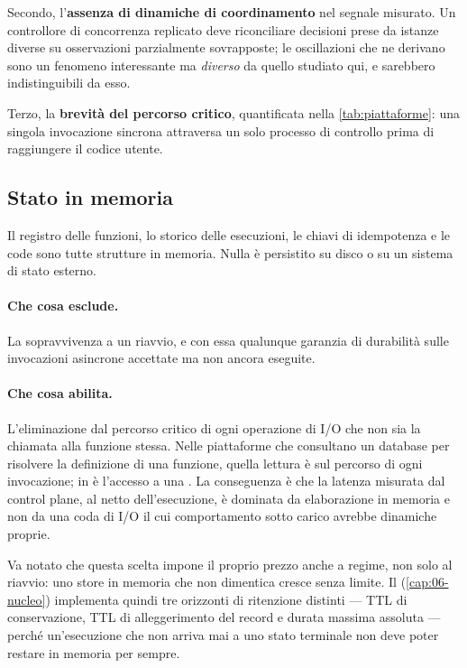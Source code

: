Secondo, l'\textbf{assenza di dinamiche di coordinamento} nel segnale misurato.
Un controllore di concorrenza replicato deve riconciliare decisioni prese da
istanze diverse su osservazioni parzialmente sovrapposte; le oscillazioni che ne
derivano sono un fenomeno interessante ma \emph{diverso} da quello studiato qui,
e sarebbero indistinguibili da esso.

Terzo, la \textbf{brevit\`a del percorso critico}, quantificata nella
\cref{tab:piattaforme}: una singola invocazione sincrona attraversa un solo
processo di controllo prima di raggiungere il codice utente.

\subsection{Stato in memoria}

Il registro delle funzioni, lo storico delle esecuzioni, le chiavi di
idempotenza e le code sono tutte strutture in memoria. Nulla \`e persistito su
disco o su un sistema di stato esterno.

\paragraph{Che cosa esclude.} La sopravvivenza a un riavvio, e con essa
qualunque garanzia di durabilit\`a sulle invocazioni asincrone accettate ma non
ancora eseguite.

\paragraph{Che cosa abilita.} L'eliminazione dal percorso critico di ogni
operazione di I/O che non sia la chiamata alla funzione stessa. Nelle
piattaforme che consultano un database per risolvere la definizione di una
funzione, quella lettura \`e sul percorso di ogni invocazione; in \nf{} \`e
l'accesso a una . La conseguenza \`e che la latenza
misurata dal control plane, al netto dell'esecuzione, \`e dominata da
elaborazione in memoria e non da una coda di I/O il cui comportamento sotto
carico avrebbe dinamiche proprie.

Va notato che questa scelta impone il proprio prezzo anche a regime, non solo al
riavvio: uno store in memoria che non dimentica cresce senza limite. Il
 (\cref{cap:06-nucleo}) implementa quindi tre orizzonti di
ritenzione distinti --- TTL di conservazione, TTL di alleggerimento del record e
durata massima assoluta --- perch\'e un'esecuzione che non arriva mai a uno stato
terminale non deve poter restare in memoria per sempre.

